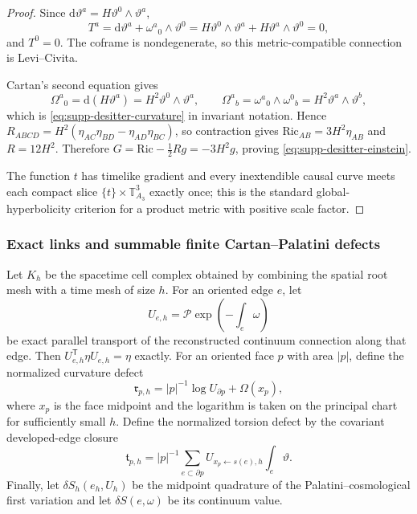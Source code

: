 \documentclass[11pt]{article}
\numberwithin{equation}{section}
\theoremstyle{definition}
\theoremstyle{remark}
\newcommand{\dd}{\mathrm d}
\newcommand{\Ric}{\mathrm{Ric}}
\begin{document}
\begin{proof}
Since
$\dd\vartheta^a=H\vartheta^0\wedge\vartheta^a$,
\[
 T^a=\dd\vartheta^a+\omega^a{}_0\wedge\vartheta^0
 =H\vartheta^0\wedge\vartheta^a
  +H\vartheta^a\wedge\vartheta^0=0,
\]
and $T^0=0$.  The coframe is nondegenerate, so this metric-compatible
connection is Levi--Civita.

Cartan's second equation gives
\[
 \Omega^a{}_0=\dd(H\vartheta^a)=H^2\vartheta^0\wedge\vartheta^a,
 \qquad
 \Omega^a{}_b=\omega^a{}_0\wedge\omega^0{}_b
 =H^2\vartheta^a\wedge\vartheta^b,
\]
which is \eqref{eq:supp-desitter-curvature} in invariant notation.  Hence
$R_{ABCD}=H^2(\eta_{AC}\eta_{BD}-\eta_{AD}\eta_{BC})$,
so contraction gives $\Ric_{AB}=3H^2\eta_{AB}$ and $R=12H^2$.  Therefore
$G=\Ric-\tfrac12Rg=-3H^2g$, proving
\eqref{eq:supp-desitter-einstein}.

The function $t$ has timelike gradient and every inextendible causal curve
meets each compact slice $\{t\}\times\mathbb T^3_{A_3}$ exactly once; this is
the standard global-hyperbolicity criterion for a product metric with positive
scale factor.
\end{proof}

\subsubsection{Exact links and summable finite Cartan--Palatini defects}

Let $K_h$ be the spacetime cell complex obtained by combining the spatial root
mesh with a time mesh of size $h$.  For an oriented edge $e$, let
\begin{equation}
 U_{e,h}=\mathcal P\exp\left(-\int_e\omega\right)
 \label{eq:supp-exact-link}
\end{equation}
be exact parallel transport of the reconstructed continuum connection along
that edge.  Then
$U_{e,h}^{\mathsf T}\eta U_{e,h}=\eta$ exactly.  For an oriented face $p$ with
area $|p|$, define the normalized curvature defect
\begin{equation}
 \mathfrak r_{p,h}
 =|p|^{-1}\log U_{\partial p}+\Omega(x_p),
 \label{eq:supp-curvature-defect}
\end{equation}
where $x_p$ is the face midpoint and the logarithm is taken on the principal
chart for sufficiently small $h$.  Define the normalized torsion defect by the
covariant developed-edge closure
\begin{equation}
 \mathfrak t_{p,h}
 =|p|^{-1}\sum_{e\subset\partial p}
  U_{x_p\leftarrow s(e),h}
  \int_e\vartheta.
 \label{eq:supp-torsion-defect}
\end{equation}
Finally, let $\delta S_h(e_h,U_h)$ be the midpoint quadrature of the
Palatini--cosmological first variation and let
$\delta S(e,\omega)$ be its continuum value.
\end{document}
